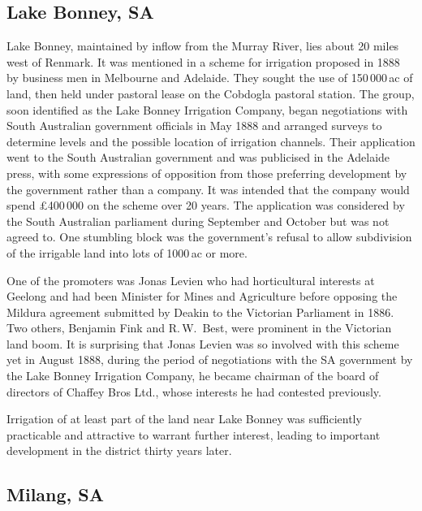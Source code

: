 \subsection*{Lake Bonney, SA}

Lake Bonney, maintained by inflow from the Murray River, lies about 20
miles west of Renmark.  It was mentioned in a scheme for irrigation
proposed in 1888 by business men in Melbourne and Adelaide.  They
sought the use of 150\,000\,ac of land, then held under pastoral lease
on the Cobdogla pastoral station.  The group, soon identified as the
Lake Bonney Irrigation Company, began negotiations with South
Australian government officials in May 1888 and arranged surveys to
determine levels and the possible location of irrigation
channels.  Their
application went to the South Australian government and was publicised
in the Adelaide press, with some expressions of opposition from those
preferring development by the government rather than a company.  It
was intended that the company would spend \pounds400\,000 on the
scheme over 20 years.  The application was considered by the South
Australian parliament during September and October but was not agreed
to.  One stumbling block was the government's refusal to allow
subdivision of the irrigable land into lots of 1000\,ac or
more.

One of the promoters was Jonas Levien who had horticultural interests
at Geelong and had been Minister for Mines and Agriculture before
opposing the Mildura agreement submitted by Deakin to the Victorian
Parliament in 1886.  Two others, Benjamin Fink and R.\,W.~Best, were
prominent in the Victorian land boom.  It is surprising that Jonas Levien was so involved
with this scheme yet in August 1888, during the period of negotiations
with the SA government by the Lake Bonney Irrigation Company, he
became chairman of the board of directors of Chaffey Bros Ltd., whose
interests he had contested previously.

Irrigation of at least part of the land near Lake Bonney was
sufficiently practicable and attractive to warrant further interest,
leading to important development in the district thirty years later.

\subsection*{Milang, SA}

